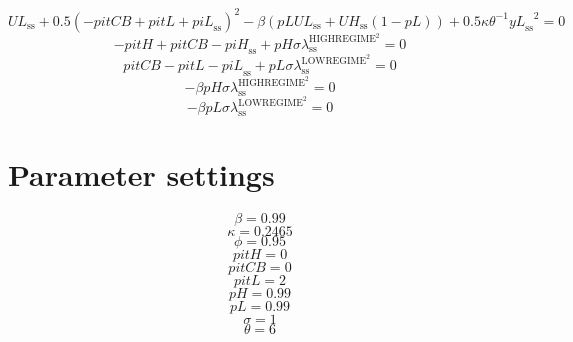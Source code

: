 \begin{equation}
{U\!L}_\mathrm{ss} + 0.5\left(-{p\!i\!t\!C\!B} + {p\!i\!t\!L} + {p\!i\!L}_\mathrm{ss}\right)^{2} - {\beta} \left({{p\!L}} {{U\!L}_\mathrm{ss}} + {{U\!H}_\mathrm{ss}} \left(1 - {p\!L}\right)\right) + 0.5{\kappa} {\theta}^{-1} {{y\!L}_\mathrm{ss}}^{2} = 0
\end{equation}
\begin{equation}
-{p\!i\!t\!H} + {p\!i\!t\!C\!B} - {p\!i\!H}_\mathrm{ss} + {{p\!H}} {\sigma} {\lambda^{\mathrm{HIGHREGIME}^{\mathrm{2}}}_\mathrm{ss}} = 0
\end{equation}
\begin{equation}
{p\!i\!t\!C\!B} - {p\!i\!t\!L} - {p\!i\!L}_\mathrm{ss} + {{p\!L}} {\sigma} {\lambda^{\mathrm{LOWREGIME}^{\mathrm{2}}}_\mathrm{ss}} = 0
\end{equation}
\begin{equation}
-{\beta} {{p\!H}} {\sigma} {\lambda^{\mathrm{HIGHREGIME}^{\mathrm{2}}}_\mathrm{ss}} = 0
\end{equation}
\begin{equation}
-{\beta} {{p\!L}} {\sigma} {\lambda^{\mathrm{LOWREGIME}^{\mathrm{2}}}_\mathrm{ss}} = 0
\end{equation}






\section{Parameter settings}

\begin{equation}
\beta = 0.99
\end{equation}
\begin{equation}
\kappa = 0.2465
\end{equation}
\begin{equation}
\phi = 0.95
\end{equation}
\begin{equation}
{p\!i\!t\!H} = 0
\end{equation}
\begin{equation}
{p\!i\!t\!C\!B} = 0
\end{equation}
\begin{equation}
{p\!i\!t\!L} = 2
\end{equation}
\begin{equation}
{p\!H} = 0.99
\end{equation}
\begin{equation}
{p\!L} = 0.99
\end{equation}
\begin{equation}
\sigma = 1
\end{equation}
\begin{equation}
\theta = 6
\end{equation}


